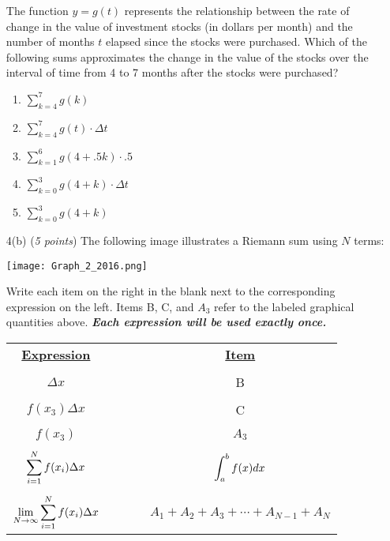 \documentclass[12pt]{report}
\begin{document}
\begin{enumerate}
The function $y=g(t)$ represents the relationship between the rate of change in the value of investment stocks (in dollars per month) and the number of months $t$ elapsed since the stocks were purchased. Which of the following sums approximates the change in the value of the stocks over the interval of time from 4 to 7 months after the stocks were purchased?

\begin{enumerate}

\item $\sum_{k=4}^7g(k)$

\item $\sum_{k=4}^7g(t)\cdot\Delta t$

\item $\sum_{k=1}^6g(4+.5k)\cdot .5$

\item $\sum_{k=0}^3g(4+k)\cdot \Delta t$

\item $\sum_{k=0}^3g(4+k)$

\end{enumerate}

\item[4(b)] (\textit{5 points}) The following image illustrates a Riemann sum using $N$ terms:\\
\begin{center}
\texttt{[image: Graph\_2\_2016.png]}
\end{center}
Write each item on the right in the blank next to the corresponding expression on the left. Items B, C, and $A_3$ refer to the labeled graphical quantities above. \textit{\textbf{Each expression will be used exactly once.}} 
\begin{center}
\begin{tabular}{c c c c c}
	\textbf{\underline{Expression}} & & & & \textbf{\underline{Item}}\\\\
	$\Delta x$ & \underline{\hspace{2.25in}} & & & B\\\\
	$f(x_3)\Delta x$ & \underline{\hspace{2.25in}} & & & C\\\\
	$f(x_3)$ & \underline{\hspace{2.25in}} & & & $A_3$\\\\
	$\displaystyle \sum_{i=1}^N f(x_i)\Delta x$ & \underline{\hspace{2.25in}} & & & $\displaystyle \int_a^b f(x)dx$\\\\
	$\displaystyle \lim_{N \to \infty} \sum_{i=1}^N f(x_i)\Delta x$ & \underline{\hspace{2.25in}} & & & $A_1+A_2+A_3+\cdots+A_{N-1}+A_N$\\
\end{tabular}
\end{center}


\end{enumerate}
\end{document}
